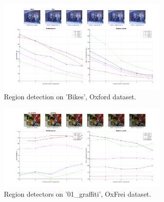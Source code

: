 \documentclass[conference,compsoc]{IEEEtran}
\begin{document}
\begin{figure}[htb]
\centering
\begin{minipage}[b]{.99\linewidth}
  \centering
  \centerline{\includegraphics[width=8.5cm]{repeatability_all_affine_bikes_blur}}
\end{minipage}
\hfill
\caption{Region detection on 'Bikes', Oxford dataset.}
\label{fig:det_bikes}
%
\end{figure}
\begin{figure}[htb]
\centering
\begin{minipage}[b]{.99\linewidth}
  \centering
 \centerline{\includegraphics[width=8.5cm]{repeatability_all_combined_01_graffiti_ligthing_good}}
\end{minipage}
\hfill
\caption{Region detectors on '01\_graffiti', OxFrei dataset.}
\label{fig:det_frei}
%
\end{figure}
\end{document}
